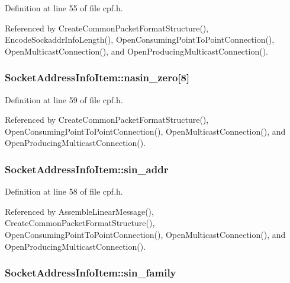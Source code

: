 \-Definition at line 55 of file cpf.\-h.



\-Referenced by \-Create\-Common\-Packet\-Format\-Structure(), \-Encode\-Sockaddr\-Info\-Length(), \-Open\-Consuming\-Point\-To\-Point\-Connection(), \-Open\-Multicast\-Connection(), and \-Open\-Producing\-Multicast\-Connection().

\hypertarget{structSocketAddressInfoItem_abaf556494b9fea3137c6c45522ab9bda}{
\subsubsection[{nasin\-\_\-zero}]{ {\bf \-Socket\-Address\-Info\-Item\-::nasin\-\_\-zero}\mbox{[}8\mbox{]}}}\label{dc/d3c/structSocketAddressInfoItem_abaf556494b9fea3137c6c45522ab9bda}


\-Definition at line 59 of file cpf.\-h.



\-Referenced by \-Create\-Common\-Packet\-Format\-Structure(), \-Open\-Consuming\-Point\-To\-Point\-Connection(), \-Open\-Multicast\-Connection(), and \-Open\-Producing\-Multicast\-Connection().

\hypertarget{structSocketAddressInfoItem_a46921af5bef9ee04546194f8d19d3163}{
\subsubsection[{sin\-\_\-addr}]{ {\bf \-Socket\-Address\-Info\-Item\-::sin\-\_\-addr}}}\label{dc/d3c/structSocketAddressInfoItem_a46921af5bef9ee04546194f8d19d3163}


\-Definition at line 58 of file cpf.\-h.



\-Referenced by \-Assemble\-Linear\-Message(), \-Create\-Common\-Packet\-Format\-Structure(), \-Open\-Consuming\-Point\-To\-Point\-Connection(), \-Open\-Multicast\-Connection(), and \-Open\-Producing\-Multicast\-Connection().

\hypertarget{structSocketAddressInfoItem_a6698e4b44eeaf0795025d0be524b8e8a}{
\subsubsection[{sin\-\_\-family}]{ {\bf \-Socket\-Address\-Info\-Item\-::sin\-\_\-family}}}\label{dc/d3c/structSocketAddressInfoItem_a6698e4b44eeaf0795025d0be524b8e8a}



